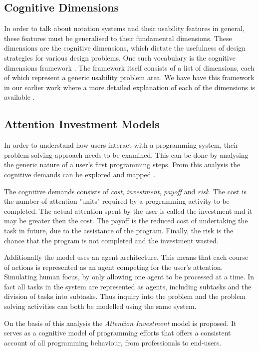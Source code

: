 \subsection{Cognitive Dimensions} \label{sec:cog-dim}
In order to talk about notation systems and their usability features in general, these features must be generalised to their fundamental dimensions. These dimensions are the cognitive dimensions, which dictate the usefulness of design strategies for various design problems. One such vocabulary is the cognitive dimensions framework \cite{green1996usability}. The framework itself consists of a list of dimensions, each of which represent a generic usability problem area.
We have have this framework in our earlier work where a more detailed explanation of each of the dimensions is available \cite{p92018gameplay}.

\subsection{Attention Investment Models} \label{sec:attention-investment}
In order to understand how users interact with a programming system, their problem solving approach needs to be examined. This can be done by analysing the generic nature of a user's first programming steps. From this analysis the  cognitive  demands can be explored and mapped \cite{blackwell2002first}.

The cognitive demands consists of \textit{cost}, \textit{investment}, \textit{payoff} and \textit{risk}. The cost is the number of attention "units" required by a programming activity to be completed. The actual attention spent by the user is called the investment and it may be greater then the cost. The payoff is the reduced cost of undertaking the task in future, due to the assistance of the program. Finally, the risk is the chance that the program is not completed and the investment wasted.

Additionally the model uses an agent architecture. This means that each course of actions is represented as an agent competing for the user's attention. Simulating human focus, by only allowing one agent to be processed at a time. In fact all tasks in the system are represented as agents, including subtasks and the division of tasks into subtasks. Thus inquiry into the problem and the problem solving activities can both be modelled using the same system.

On  the  basis  of  this  analysis  the  \textit{Attention Investment} model is proposed. It serves as a cognitive model of programming efforts that offers a consistent account of all programming behaviour, from professionals to end-users.

